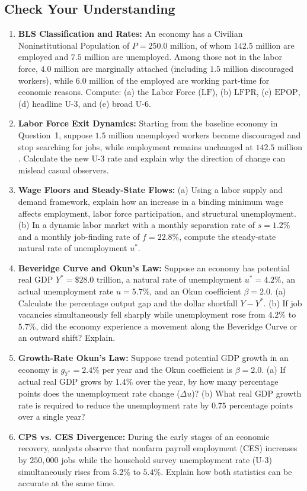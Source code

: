 \documentclass[11pt, a4paper]{article}
\begin{document}
\subsection*{Check Your Understanding}
\begin{enumerate}[leftmargin=1.5em, itemsep=6pt]
  \item \textbf{BLS Classification and Rates:} An economy has a Civilian Noninstitutional Population of $P = 250.0\text{ million}$, of whom $142.5\text{ million}$ are employed and $7.5\text{ million}$ are unemployed. Among those not in the labor force, $4.0\text{ million}$ are marginally attached (including $1.5\text{ million}$ discouraged workers), while $6.0\text{ million}$ of the employed are working part-time for economic reasons. Compute: (a) the Labor Force ($\text{LF}$), (b) $\text{LFPR}$, (c) $\text{EPOP}$, (d) headline $\text{U-3}$, and (e) broad $\text{U-6}$.
  \item \textbf{Labor Force Exit Dynamics:} Starting from the baseline economy in Question~1, suppose $1.5\text{ million}$ unemployed workers become discouraged and stop searching for jobs, while employment remains unchanged at $142.5\text{ million}$. Calculate the new $\text{U-3}$ rate and explain why the direction of change can mislead casual observers.
  \item \textbf{Wage Floors and Steady-State Flows:} (a) Using a labor supply and demand framework, explain how an increase in a binding minimum wage affects employment, labor force participation, and structural unemployment. (b) In a dynamic labor market with a monthly separation rate of $s = 1.2\%$ and a monthly job-finding rate of $f = 22.8\%$, compute the steady-state natural rate of unemployment $u^*$.
  \item \textbf{Beveridge Curve and Okun's Law:} Suppose an economy has potential real GDP $Y^* = \$28.0\text{ trillion}$, a natural rate of unemployment $u^* = 4.2\%$, an actual unemployment rate $u = 5.7\%$, and an Okun coefficient $\beta = 2.0$. (a) Calculate the percentage output gap and the dollar shortfall $Y - Y^*$. (b) If job vacancies simultaneously fell sharply while unemployment rose from $4.2\%$ to $5.7\%$, did the economy experience a movement along the Beveridge Curve or an outward shift? Explain.
  \item \textbf{Growth-Rate Okun's Law:} Suppose trend potential GDP growth in an economy is $g_{Y^*} = 2.4\%$ per year and the Okun coefficient is $\beta = 2.0$. (a) If actual real GDP grows by $1.4\%$ over the year, by how many percentage points does the unemployment rate change ($\Delta u$)? (b) What real GDP growth rate is required to reduce the unemployment rate by $0.75\text{ percentage points}$ over a single year?
  \item \textbf{CPS vs. CES Divergence:} During the early stages of an economic recovery, analysts observe that nonfarm payroll employment (CES) increases by $250{,}000$ jobs while the household survey unemployment rate (U-3) simultaneously rises from $5.2\%$ to $5.4\%$. Explain how both statistics can be accurate at the same time.
\end{enumerate}
\end{document}
